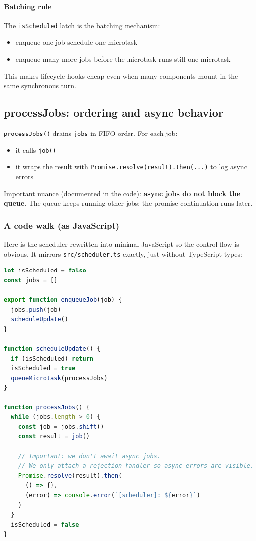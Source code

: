 \paragraph{Batching rule}

The \texttt{isScheduled} latch is the batching mechanism:

\begin{itemize}
  \item enqueue one job \textrightarrow schedule one microtask
  \item enqueue many more jobs before the microtask runs \textrightarrow still one microtask
\end{itemize}

This makes lifecycle hooks cheap even when many components mount in the same synchronous turn.

\subsection{processJobs: ordering and async behavior}

\texttt{processJobs()} drains \texttt{jobs} in FIFO order. For each job:

\begin{itemize}
  \item it calls \texttt{job()}
  \item it wraps the result with \texttt{Promise.resolve(result).then(...)} to log async errors
\end{itemize}

Important nuance (documented in the code): \textbf{async jobs do not block the queue}.
The queue keeps running other jobs; the promise continuation runs later.

\subsubsection{A code walk (as JavaScript)}

Here is the scheduler rewritten into minimal JavaScript so the control flow is obvious.
It mirrors \texttt{src/scheduler.ts} exactly, just without TypeScript types:

\begin{lstlisting}[style=relax,language=JavaScript]
let isScheduled = false
const jobs = []

export function enqueueJob(job) {
  jobs.push(job)
  scheduleUpdate()
}

function scheduleUpdate() {
  if (isScheduled) return
  isScheduled = true
  queueMicrotask(processJobs)
}

function processJobs() {
  while (jobs.length > 0) {
    const job = jobs.shift()
    const result = job()

    // Important: we don't await async jobs.
    // We only attach a rejection handler so async errors are visible.
    Promise.resolve(result).then(
      () => {},
      (error) => console.error(`[scheduler]: ${error}`)
    )
  }
  isScheduled = false
}
\end{lstlisting}

